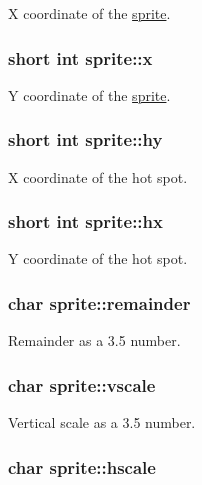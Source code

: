 X coordinate of the \hyperlink{structsprite}{sprite}. \hypertarget{structsprite_5b48711690e0d8fd0b25a82a18756816}{
\subsubsection{\setlength{\rightskip}{0pt plus 5cm}short int {\bf sprite::x}}}
\label{structsprite_5b48711690e0d8fd0b25a82a18756816}


Y coordinate of the \hyperlink{structsprite}{sprite}. \hypertarget{structsprite_3aef5a02d3b7ac32229ae776b468b278}{
\subsubsection{\setlength{\rightskip}{0pt plus 5cm}short int {\bf sprite::hy}}}
\label{structsprite_3aef5a02d3b7ac32229ae776b468b278}


X coordinate of the hot spot. \hypertarget{structsprite_2b3011ec3ce10cc3211fb7bdc17d3e8b}{
\subsubsection{\setlength{\rightskip}{0pt plus 5cm}short int {\bf sprite::hx}}}
\label{structsprite_2b3011ec3ce10cc3211fb7bdc17d3e8b}


Y coordinate of the hot spot. \hypertarget{structsprite_508c1537b3f534015567605adc0178c1}{
\subsubsection{\setlength{\rightskip}{0pt plus 5cm}char {\bf sprite::remainder}}}
\label{structsprite_508c1537b3f534015567605adc0178c1}


Remainder as a 3.5 number. \hypertarget{structsprite_a5b542ecac2fc466bcc651cd5053096e}{
\subsubsection{\setlength{\rightskip}{0pt plus 5cm}char {\bf sprite::vscale}}}
\label{structsprite_a5b542ecac2fc466bcc651cd5053096e}


Vertical scale as a 3.5 number. \hypertarget{structsprite_85b8ccf657c3b74535a497b57adf47c2}{
\subsubsection{\setlength{\rightskip}{0pt plus 5cm}char {\bf sprite::hscale}}}
\label{structsprite_85b8ccf657c3b74535a497b57adf47c2}


